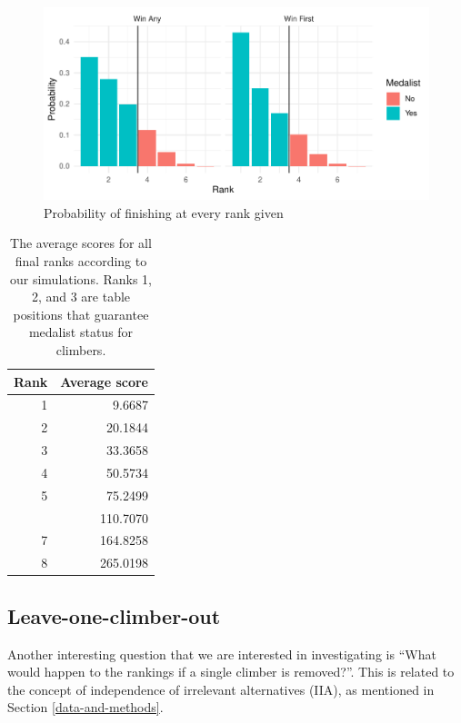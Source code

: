 \documentclass[12pt]{article}
\begin{document}
\begin{figure}

{\centering \includegraphics{draft_files/figure-latex/unnamed-chunk-10-1} 

}

\caption{Probability of finishing at every rank given}\label{fig:unnamed-chunk-10}
\end{figure}

\begin{table}

\caption{\label{tab:unnamed-chunk-11}The average scores for all final ranks according to our simulations. Ranks 1, 2, and 3 are table positions that guarantee medalist status for climbers.}
\centering
\begin{tabular}[t]{rr}
\toprule
Rank & Average score\\
\midrule
1 & 9.6687\\
2 & 20.1844\\
3 & 33.3658\\
4 & 50.5734\\
5 & 75.2499\\
\addlinespace
6 & 110.7070\\
7 & 164.8258\\
8 & 265.0198\\
\bottomrule
\end{tabular}
\end{table}

\hypertarget{leave-one-climber-out}{%
\subsection{Leave-one-climber-out}\label{leave-one-climber-out}}

Another interesting question that we are interested in investigating is
``What would happen to the rankings if a single climber is removed?''.
This is related to the concept of independence of irrelevant
alternatives (IIA), as mentioned in Section \ref{data-and-methods}.
\end{document}

